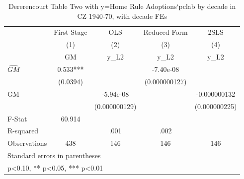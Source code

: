 \begin{table}[htbp]\centering
\def\sym#1{\ifmmode^{#1}\else\(^{#1}\)\fi}
\caption{Dererencourt Table Two with y=Home Rule Adoptions`pclab by decade in CZ 1940-70, with decade FEs}
\begin{tabular}{l*{4}{c}}
\toprule
                    & First Stage   &         OLS   &Reduced Form   &        2SLS   \\
                    &\multicolumn{1}{c}{(1)}&\multicolumn{1}{c}{(2)}&\multicolumn{1}{c}{(3)}&\multicolumn{1}{c}{(4)}\\
                    &\multicolumn{1}{c}{GM}&\multicolumn{1}{c}{y\_L2}&\multicolumn{1}{c}{y\_L2}&\multicolumn{1}{c}{y\_L2}\\
\midrule
$\hat{GM}$          &       0.533***&               &   -7.40e-08   &               \\
                    &    (0.0394)   &               &(0.000000127)   &               \\
\addlinespace
GM                  &               &   -5.94e-08   &               &-0.000000132   \\
                    &               &(0.000000129)   &               &(0.000000225)   \\
\midrule
F-Stat              &      60.914   &               &               &               \\
R-squared           &               &        .001   &        .002   &               \\
Observations        &         438   &         146   &         146   &         146   \\
\bottomrule
\multicolumn{5}{l}{\footnotesize Standard errors in parentheses}\\
\multicolumn{5}{l}{\footnotesize * p<0.10, ** p<0.05, *** p<0.01}\\
\end{tabular}
\end{table}
